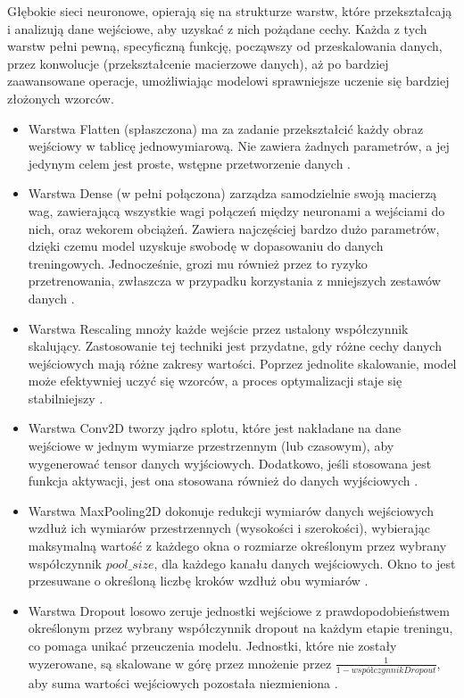 Głębokie sieci neuronowe, opierają się na strukturze warstw,
które przekształcają i analizują dane wejściowe, aby uzyskać z nich pożądane cechy.
Każda z tych warstw pełni pewną, specyficzną funkcję, począwszy od przeskalowania danych,
przez konwolucje (przekształcenie macierzowe danych),
aż po bardziej zaawansowane operacje, umożliwiając modelowi sprawniejsze uczenie się bardziej złożonych wzorców.
\begin{itemize}[label=-,labelsep=0.4cm,leftmargin=0.6cm]   
	\item Warstwa Flatten (spłaszczona) ma za zadanie przekształcić każdy obraz wejściowy w tablicę jednowymiarową.
		Nie zawiera żadnych parametrów, a jej jedynym celem jest proste, wstępne przetworzenie danych \cite{Geron2020}.
	\item Warstwa Dense (w pełni połączona) zarządza samodzielnie swoją macierzą wag,
		zawierającą wszystkie wagi połączeń między neuronami a wejściami do nich, oraz wekorem obciążeń.
		Zawiera najczęściej bardzo dużo parametrów, dzięki czemu model uzyskuje swobodę w dopasowaniu do danych treningowych.
		Jednocześnie, grozi mu również przez to ryzyko przetrenowania,
		zwłaszcza w przypadku korzystania z mniejszych zestawów danych \cite{Geron2020}.
    \item Warstwa Rescaling mnoży każde wejście przez ustalony współczynnik skalujący.
		Zastosowanie tej techniki jest przydatne, gdy różne cechy danych wejściowych mają różne zakresy wartości.
		Poprzez jednolite skalowanie, model może efektywniej uczyć się wzorców, a proces optymalizacji staje się stabilniejszy \cite{Fenner2020}.
	\item Warstwa Conv2D tworzy jądro splotu, które jest nakładane na dane wejściowe w jednym wymiarze przestrzennym (lub czasowym), 
		aby wygenerować tensor danych wyjściowych.
		Dodatkowo, jeśli stosowana jest funkcja aktywacji, jest ona stosowana również do danych wyjściowych \cite{Geron2020}.
	\item Warstwa MaxPooling2D dokonuje redukcji wymiarów danych wejściowych wzdłuż ich wymiarów przestrzennych (wysokości i szerokości),
		wybierając maksymalną wartość z każdego okna o rozmiarze określonym przez wybrany współczynnik $pool\_size$,
		dla każdego kanału danych wejściowych.
		Okno to jest przesuwane o określoną liczbę kroków wzdłuż obu wymiarów \cite{Geron2020}.
	\item Warstwa Dropout losowo zeruje jednostki wejściowe z prawdopodobieństwem określonym
		przez wybrany współczynnik dropout na każdym etapie treningu, co pomaga unikać przeuczenia modelu.
		Jednostki, które nie zostały wyzerowane, są skalowane w górę przez mnożenie przez $\frac{1}{1 - współczynnikDropout}$,
		aby suma wartości wejściowych pozostała niezmieniona \cite{Geron2020}.
\end{itemize}
